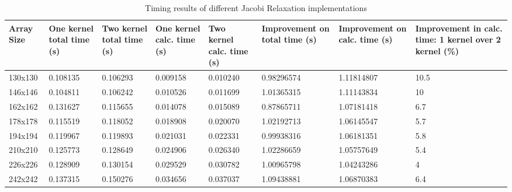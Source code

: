\documentclass[10pt, twocolumn]{article}
\begin{document}
    \begin{center}
    \begin{table*}[ht]\footnotesize
        \begin{tabular}{ | p{1.3cm} | p{1.5cm} | p{1.5cm} | p{1.6cm} | p{1.6cm} | p{2cm} | p{1.9cm} | p{2cm} | }
            \hline
            Array Size  & One kernel total time (s) & Two kernel total time (s) & One kernel calc. time (s) & Two kernel calc. time (s) & Improvement on total time (s) & Improvement on calc. time (s) & Improvement in calc. time: 1 kernel over 2 kernel (\%) \\ \hline
            130x130 & 0.108135    & 0.106293    & 0.009158    & 0.010240    & 0.98296574  & 1.11814807  & 10.5  \\
            146x146 & 0.104811    & 0.106242    & 0.010526    & 0.011699    & 1.01365315  & 1.11143834  & 10    \\
            162x162 & 0.131627    & 0.115655    & 0.014078    & 0.015089    & 0.87865711  & 1.07181418  & 6.7   \\
            178x178 & 0.115519    & 0.118052    & 0.018908    & 0.020070    & 1.02192713  & 1.06145547  & 5.7   \\
            194x194 & 0.119967    & 0.119893    & 0.021031    & 0.022331    & 0.99938316  & 1.06181351  & 5.8   \\
            210x210 & 0.125773    & 0.128649    & 0.024906    & 0.026340    & 1.02286659  & 1.05757649  & 5.4   \\
            226x226 & 0.128909    & 0.130154    & 0.029529    & 0.030782    & 1.00965798  & 1.04243286  & 4     \\
            242x242 & 0.137315    & 0.150276    & 0.034656    & 0.037037    & 1.09438881  & 1.06870383  & 6.4   \\
            \hline
        \end{tabular}
        \caption{Timing results of different Jacobi Relaxation implementations}
        \label{tab:timing}
        \end{table*}
    \end{center}
\end{document}
